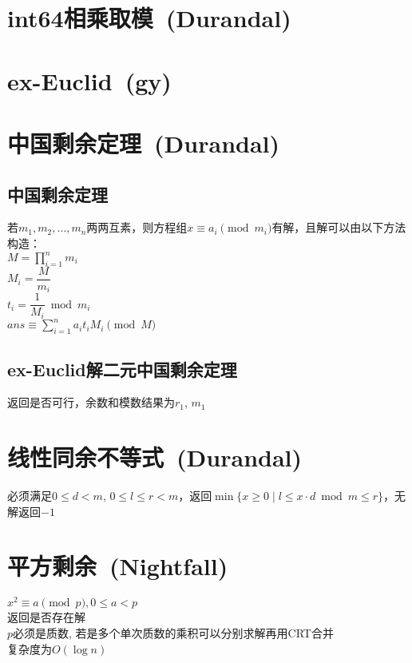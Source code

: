 \section{int64相乘取模\ \small(Durandal)}

\section{ex-Euclid\ \small(gy)}

\section{中国剩余定理\ \small(Durandal)}
    \subsection*{中国剩余定理}
        若$ m_1, m_2, \dots, m_n $两两互素，则方程组$ x \equiv a_i \pmod{m_i} $有解，且解可以由以下方法构造：
        \\$ M = \prod\limits_{i = 1}^{n} m_i $
        \\$ M_i = \dfrac{M}{m_i} $
        \\$ t_i = \dfrac{1}{M_i} \bmod m_i $
        \\$ ans \equiv \sum\limits_{i = 1}^{n} a_i t_i M_i \pmod M $
    \subsection*{ex-Euclid解二元中国剩余定理}
        返回是否可行，余数和模数结果为$ r_1 $, $ m_1 $

\section{线性同余不等式\ \small(Durandal)}
    必须满足$ 0 \leq d < m $, $ 0 \leq l \leq r < m $，返回$ \min\lbrace x \geq 0 \mid l \leq x \cdot d \bmod m \leq r \rbrace $，无解返回$ -1 $ 

\section{平方剩余\ \small(Nightfall)}
    $ x^2 \equiv a \pmod p, 0 \leq a < p $
    \\返回是否存在解
    \\$ p $必须是质数, 若是多个单次质数的乘积可以分别求解再用CRT合并
    \\复杂度为$ O(\log n) $

